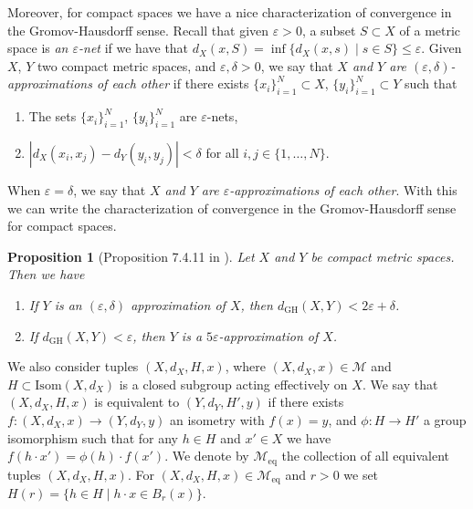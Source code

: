 \documentclass[12pt,a4paper,reqno]{amsart}
\newtheorem{prop}[theorem]{Proposition}
\theoremstyle{definition}
\numberwithin{equation}{section}
\begin{document}
Moreover, for compact spaces we have a nice characterization of convergence in the Gromov-Hausdorff sense. Recall that given $\varepsilon >0$, a subset $S\subset X$ of a metric space is \emph{an $\varepsilon$-net} if we have that $d_X(x,S) = \inf\{d_X(x,s)\mid s\in S\}\leq \varepsilon$. Given $X$, $Y$ two compact metric spaces, and $\varepsilon,\delta>0$, we say that \emph{$X$ and $Y$ are $(\varepsilon,\delta)$-approximations of each other} if there exists $\{x_i\}_{i=1}^N\subset X$, $\{y_i\}_{i=1}^N\subset Y$ such that 
\begin{enumerate}
\item The sets $\{x_i\}_{i=1}^N$, $\{y_i\}_{i=1}^N$ are $\varepsilon$-nets,
\item $|d_X(x_i,x_j)-d_Y(y_i,y_j)|<\delta$ for all $i,j\in \{1,\ldots,N\}$.
\end{enumerate}
When $\varepsilon= \delta$, we say that \emph{$X$ and $Y$ are $\varepsilon$-approximations of each other}. With this we can write the characterization of convergence in the Gromov-Hausdorff sense for compact spaces.

\begin{prop}[Proposition 7.4.11 in \cite{BuragoBuragoIvanov}]\th\label{P: characterization of GH convergence via approximations}
Let $X$ and $Y$ be compact metric spaces. Then we have
\begin{enumerate}[(1)]
\item If $Y$ is an $(\varepsilon,\delta)$ approximation of $X$, then $d_{\mathrm{GH}}(X,Y)< 2\varepsilon+\delta$.
\item If $d_{\mathrm{GH}}(X,Y)<\varepsilon$, then $Y$ is a $5\varepsilon$-approximation of $X$.
\end{enumerate}
\end{prop}


We also consider tuples $(X,d_X,H,x)$,  where $(X,d_X,x)\in \mathcal{M}$ and $H\subset \mathrm{Isom}(X,d_X)$ is a closed subgroup acting effectively on $X$. We say that $(X,d_X,H,x)$ is equivalent to $(Y,d_Y,H',y)$ if there exists $f\colon (X,d_X,x)\to (Y,d_Y,y)$ an isometry with $f(x) = y$, and $\phi\colon H\to H'$ a group isomorphism such that for any $h\in H$ and $x'\in X$ we have $f(h\cdot x') = \phi(h)\cdot f(x')$. We denote by $\mathcal{M}_{\mathrm{eq}}$ the collection of all equivalent tuples $(X,d_X,H,x)$. For $(X,d_X,H,x)\in \mathcal{M}_{\mathrm{eq}}$ and $r>0$ we set $H(r) = \{h\in H\mid h\cdot x\in B_r(x)\}$.
\end{document}
